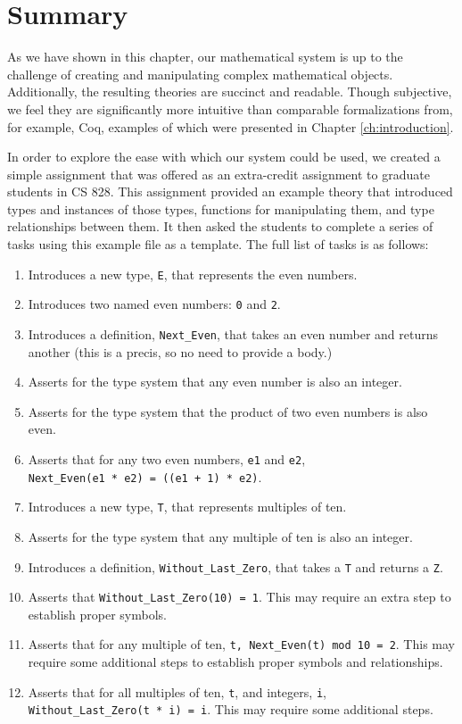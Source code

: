 \section{Summary}
As we have shown in this chapter, our mathematical system is up to the challenge of creating and manipulating complex mathematical objects.  Additionally, the resulting theories are succinct and readable.  Though subjective, we feel they are significantly more intuitive than comparable formalizations from, for example, Coq, examples of which were presented in Chapter \ref{ch:introduction}.

In order to explore the ease with which our system could be used, we created a simple assignment that was offered as an extra-credit assignment to graduate students in CS 828.  This assignment provided an example theory that introduced types and instances of those types, functions for manipulating them, and type relationships between them.  It then asked the students to complete a series of tasks using this example file as a template.  The full list of tasks is as follows:

\begin{enumerate}
	\item Introduces a new type, \texttt{E}, that represents the even numbers.
	\item Introduces two named even numbers: \texttt{0} and \texttt{2}.
	\item Introduces a definition, \texttt{Next\_Even}, that takes an even number and returns another (this is a precis, so no need to provide a body.)
	\item Asserts for the type system that any even number is also an integer.
	\item Asserts for the type system that the product of two even numbers is also even.
	\item Asserts that for any two even numbers, \texttt{e1} and \texttt{e2}, \texttt{Next\_Even(e1~*~e2)~=~((e1~+~1)~*~e2)}.
	\item Introduces a new type, \texttt{T}, that represents multiples of ten.
	\item Asserts for the type system that any multiple of ten is also an integer.
	\item Introduces a definition, \texttt{Without\_Last\_Zero}, that takes a \texttt{T} and returns a \texttt{Z}.
	\item Asserts that \texttt{Without\_Last\_Zero(10)~=~1}.  This may require an extra step to establish proper symbols.
	\item Asserts that for any multiple of ten, \texttt{t,~Next\_Even(t)~mod~10~=~2}.  This may require some additional steps to establish proper symbols and relationships.
	\item Asserts that for all multiples of ten, \texttt{t}, and integers, \texttt{i}, \texttt{Without\_Last\_Zero(t~*~i)~=~i}.  This may require some additional steps.
\end{enumerate}

